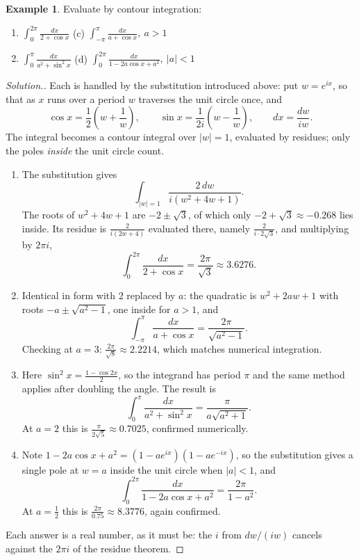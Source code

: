 \documentclass[11pt,a4paper]{article}
\theoremstyle{definition}
\newtheorem{example}[thm]{Example}
\newenvironment{solution}
  {\renewcommand{\qedsymbol}{}\begin{proof}[\textit{Solution}.]}
  {\end{proof}}
\begin{document}
\begin{example}
Evaluate by contour integration:
\begin{enumerate}
\item[(a)] $\displaystyle{\int^{2\pi}_0 \frac{dx}{2 + \cos x}}$
\qquad (c) $\displaystyle{\int^{\pi}_{-\pi}\frac{dx}{a + \cos x}},\ a> 1$
\item[(b)] $\displaystyle{\int^{\pi}_0 \frac{dx}{a^2 + \sin^2x}}$
\qquad (d) $\displaystyle{\int^{2\pi}_0 \frac{dx}{1 -2a\cos x + a^2}},\ |a| < 1$
\end{enumerate}
\end{example}
\begin{solution}
Each is handled by the substitution introduced above: put $w=e^{ix}$, so that as
$x$ runs over a period $w$ traverses the unit circle once, and
$$\cos x=\frac{1}{2}\left(w+\frac1w\right),\qquad
\sin x=\frac{1}{2i}\left(w-\frac1w\right),\qquad dx=\frac{dw}{iw}.$$
The integral becomes a contour integral over $\left|w\right|=1$, evaluated by
residues; only the poles \emph{inside} the unit circle count.

\begin{enumerate}
\item[(a)] The substitution gives
$$\int_{\left|w\right|=1}\frac{2\,dw}{i\left(w^2+4w+1\right)} .$$
The roots of $w^2+4w+1$ are $-2\pm\sqrt3$, of which only $-2+\sqrt3\approx
-0.268$ lies inside. Its residue is $\frac{2}{i\left(2w+4\right)}$ evaluated
there, namely $\frac{2}{i\cdot 2\sqrt3}$, and multiplying by $2\pi i$,
$$\int^{2\pi}_0 \frac{dx}{2+\cos x}=\frac{2\pi}{\sqrt3}\approx 3.6276 .$$

\item[(c)] Identical in form with $2$ replaced by $a$: the quadratic is
$w^2+2aw+1$ with roots $-a\pm\sqrt{a^2-1}$, one inside for $a>1$, and
$$\int^{\pi}_{-\pi}\frac{dx}{a+\cos x}=\frac{2\pi}{\sqrt{a^2-1}} .$$
Checking at $a=3$: $\frac{2\pi}{\sqrt8}\approx 2.2214$, which matches numerical
integration.

\item[(b)] Here $\sin^2x=\frac{1-\cos 2x}{2}$, so the integrand has period
$\pi$ and the same method applies after doubling the angle. The result is
$$\int^{\pi}_0 \frac{dx}{a^2+\sin^2x}=\frac{\pi}{a\sqrt{a^2+1}} .$$
At $a=2$ this is $\frac{\pi}{2\sqrt5}\approx 0.7025$, confirmed numerically.

\item[(d)] Note $1-2a\cos x+a^2=\left(1-ae^{ix}\right)\left(1-ae^{-ix}\right)$,
so the substitution gives a single pole at $w=a$ inside the unit circle when
$\left|a\right|<1$, and
$$\int^{2\pi}_0 \frac{dx}{1-2a\cos x+a^2}=\frac{2\pi}{1-a^2} .$$
At $a=\frac12$ this is $\frac{2\pi}{0.75}\approx 8.3776$, again confirmed.
\end{enumerate}
Each answer is a real number, as it must be: the $i$ from $dw/(iw)$ cancels
against the $2\pi i$ of the residue theorem.
\end{solution}
\end{document}
